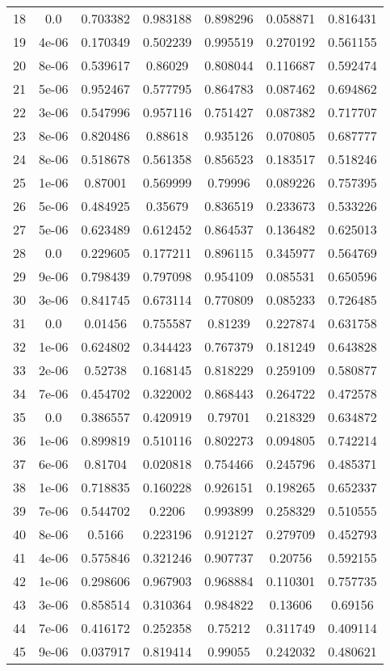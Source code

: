 \begin{table}
\begin{tabular*}{\linewidth}{c|c|c|c|c|c|c}
18 & 0.0 & 0.703382 & 0.983188 & 0.898296 & 0.058871 & 0.816431\\
19 & 4e-06 & 0.170349 & 0.502239 & 0.995519 & 0.270192 & 0.561155\\
20 & 8e-06 & 0.539617 & 0.86029 & 0.808044 & 0.116687 & 0.592474\\
21 & 5e-06 & 0.952467 & 0.577795 & 0.864783 & 0.087462 & 0.694862\\
22 & 3e-06 & 0.547996 & 0.957116 & 0.751427 & 0.087382 & 0.717707\\
23 & 8e-06 & 0.820486 & 0.88618 & 0.935126 & 0.070805 & 0.687777\\
24 & 8e-06 & 0.518678 & 0.561358 & 0.856523 & 0.183517 & 0.518246\\
25 & 1e-06 & 0.87001 & 0.569999 & 0.79996 & 0.089226 & 0.757395\\
26 & 5e-06 & 0.484925 & 0.35679 & 0.836519 & 0.233673 & 0.533226\\
27 & 5e-06 & 0.623489 & 0.612452 & 0.864537 & 0.136482 & 0.625013\\
28 & 0.0 & 0.229605 & 0.177211 & 0.896115 & 0.345977 & 0.564769\\
29 & 9e-06 & 0.798439 & 0.797098 & 0.954109 & 0.085531 & 0.650596\\
30 & 3e-06 & 0.841745 & 0.673114 & 0.770809 & 0.085233 & 0.726485\\
31 & 0.0 & 0.01456 & 0.755587 & 0.81239 & 0.227874 & 0.631758\\
32 & 1e-06 & 0.624802 & 0.344423 & 0.767379 & 0.181249 & 0.643828\\
33 & 2e-06 & 0.52738 & 0.168145 & 0.818229 & 0.259109 & 0.580877\\
34 & 7e-06 & 0.454702 & 0.322002 & 0.868443 & 0.264722 & 0.472578\\
35 & 0.0 & 0.386557 & 0.420919 & 0.79701 & 0.218329 & 0.634872\\
36 & 1e-06 & 0.899819 & 0.510116 & 0.802273 & 0.094805 & 0.742214\\
37 & 6e-06 & 0.81704 & 0.020818 & 0.754466 & 0.245796 & 0.485371\\
38 & 1e-06 & 0.718835 & 0.160228 & 0.926151 & 0.198265 & 0.652337\\
39 & 7e-06 & 0.544702 & 0.2206 & 0.993899 & 0.258329 & 0.510555\\
40 & 8e-06 & 0.5166 & 0.223196 & 0.912127 & 0.279709 & 0.452793\\
41 & 4e-06 & 0.575846 & 0.321246 & 0.907737 & 0.20756 & 0.592155\\
42 & 1e-06 & 0.298606 & 0.967903 & 0.968884 & 0.110301 & 0.757735\\
43 & 3e-06 & 0.858514 & 0.310364 & 0.984822 & 0.13606 & 0.69156\\
44 & 7e-06 & 0.416172 & 0.252358 & 0.75212 & 0.311749 & 0.409114\\
45 & 9e-06 & 0.037917 & 0.819414 & 0.99055 & 0.242032 & 0.480621\\
\end{tabular*}
\end{table}
